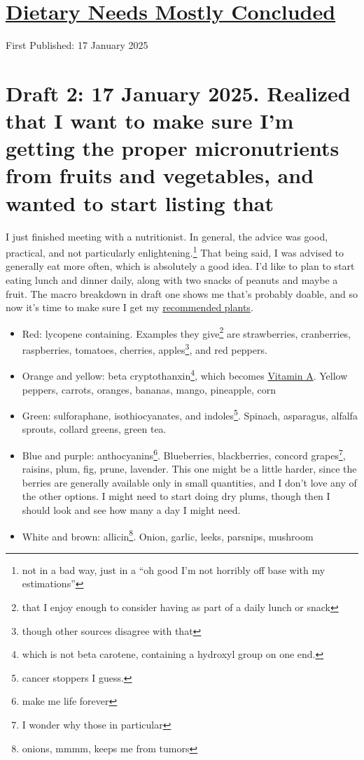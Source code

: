 \documentclass[12pt]{article}[titlepage]
\newcommand{\say}[1]{``#1''}
\renewcommand{\,}{\textsuperscript{,}}
\begin{document}
\doublespacing
\section{\href{dietary-needs-4.html}{Dietary Needs Mostly Concluded}}

First Published: 17 January 2025

\section{Draft 2: 17 January 2025. Realized that I want to make sure I'm getting the proper micronutrients from fruits and vegetables, and wanted to start listing that}

I just finished meeting with a nutritionist.  
In general, the advice was good, practical, and not particularly enlightening.\footnote{not in a bad way, just in a \say{oh good I'm not horribly off base with my estimations}  }
That being said, I was advised to generally eat more often, which is absolutely a good idea.  
I'd like to plan to start eating lunch and dinner daily, along with two snacks of peanuts and maybe a fruit.  
The macro breakdown in draft one shows me that's probably doable, and so now it's time to make sure I get my \href{https://www.health.harvard.edu/blog/phytonutrients-paint-your-plate-with-the-colors-of-the-rainbow-2019042516501}{recommended plants}.  


\begin{itemize}  
\item Red: lycopene containing. Examples they give\footnote{that I enjoy enough to consider having as part of a daily lunch or snack} are strawberries, cranberries, raspberries, tomatoes, cherries, apples\footnote{though other sources disagree with that}, and red peppers.  
\item Orange and yellow: beta cryptothanxin\footnote{which is not beta carotene, containing a hydroxyl group on one end.}, which becomes \href{https://en.wikipedia.org/wiki/\%CE\%92-Cryptoxanthin}{Vitamin A}. Yellow peppers, carrots, oranges, bananas, mango, pineapple, corn  
\item Green: sulforaphane, isothiocyanates, and indoles\footnote{cancer stoppers I guess.}. Spinach, asparagus, alfalfa sprouts, collard greens, green tea.  
\item Blue and purple: anthocyanins\footnote{make me life forever}. Blueberries, blackberries, concord grapes\footnote{I wonder why those in particular}, raisins, plum, fig, prune, lavender.
This one might be a little harder, since the berries are generally available only in small quantities, and I don't love any of the other options. I might need to start doing dry plums, though then I should look and see how many a day I might need.  
\item White and brown: allicin\footnote{onions, mmmm, keeps me from tumors}. Onion, garlic, leeks, parsnips, mushroom  
\end{itemize}
\end{document}
